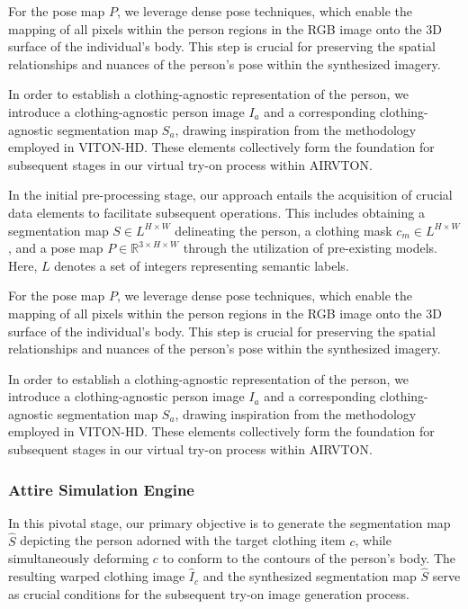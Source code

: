     For the pose map \( P \), we leverage dense pose techniques, which enable the mapping of all pixels within the person regions in the RGB image onto the 3D surface of the individual's body. This step is crucial for preserving the spatial relationships and nuances of the person's pose within the synthesized imagery.

    In order to establish a clothing-agnostic representation of the person, we introduce a clothing-agnostic person image \( I_a \) and a corresponding clothing-agnostic segmentation map \( S_a \), drawing inspiration from the methodology employed in VITON-HD. These elements collectively form the foundation for subsequent stages in our virtual try-on process within AIRVTON.

    In the initial pre-processing stage, our approach entails the acquisition of crucial data elements to facilitate subsequent operations. This includes obtaining a segmentation map \( S \in L^{H \times W} \) delineating the person, a clothing mask \( c_m \in L^{H \times W} \), and a pose map \( P \in \mathbb{R}^{3 \times H \times W} \) through the utilization of pre-existing models. Here, \( L \) denotes a set of integers representing semantic labels.

    For the pose map \( P \), we leverage dense pose techniques, which enable the mapping of all pixels within the person regions in the RGB image onto the 3D surface of the individual's body. This step is crucial for preserving the spatial relationships and nuances of the person's pose within the synthesized imagery.

    In order to establish a clothing-agnostic representation of the person, we introduce a clothing-agnostic person image \( I_a \) and a corresponding clothing-agnostic segmentation map \( S_a \), drawing inspiration from the methodology employed in VITON-HD. These elements collectively form the foundation for subsequent stages in our virtual try-on process within AIRVTON.


\subsubsection{Attire Simulation Engine}
    In this pivotal stage, our primary objective is to generate the segmentation map \( \hat{S} \) depicting the person adorned with the target clothing item \( c \), while simultaneously deforming \( c \) to conform to the contours of the person's body. The resulting warped clothing image \( \hat{I}_c \) and the synthesized segmentation map \( \hat{S} \) serve as crucial conditions for the subsequent try-on image generation process.


